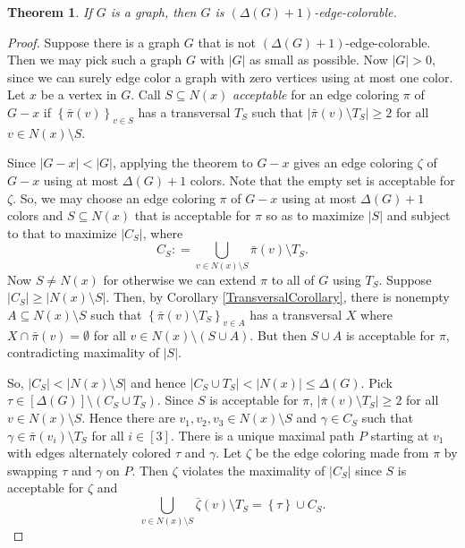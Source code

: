 \documentclass[openany]{tufte-book} %
\theoremstyle{plain}
\newtheorem{theorem}{Theorem}
\newcommand{\set}[1]{\left\{ #1 \right\}}
\newcommand{\card}[1]{\left|#1\right|}
\newcommand{\irange}[1]{\left[#1\right]}
\newcommand{\parens}[1]{\left( #1 \right)}
\newcommand{\DefinedAs}{\mathrel{\mathop:}=}
\begin{document}
\begin{theorem}
If $G$ is a graph, then $G$ is $\parens{\Delta(G) + 1}$-edge-colorable.
\end{theorem}
\begin{proof}
Suppose there is a graph $G$ that is not $(\Delta(G) + 1)$-edge-colorable.  Then we may pick such a graph $G$ with $\card{G}$ as small as possible.
Now $\card{G} > 0$, since we can surely edge color a graph with zero vertices using at most one color. Let $x$ be a vertex in $G$.   Call $S\subseteq N(x)$ \emph{acceptable} for 
an edge coloring $\pi$ of $G-x$ if $\set{\bar{\pi}(v)}_{v \in S}$ has a transversal $T_S$ such that $\card{\bar{\pi}(v) \setminus T_S} \ge 2$ for all $v \in N(x)\setminus S$.

Since $\card{G-x} < \card{G}$, applying the theorem to $G-x$ gives an edge coloring $\zeta$ of $G-x$ using at most $\Delta(G) + 1$ colors. 
Note that the empty set is acceptable for $\zeta$.  So, we may choose an edge coloring $\pi$ of $G-x$ using at most $\Delta(G) + 1$ colors and $S\subseteq N(x)$ 
that is acceptable for $\pi$ so as to maximize $\card{S}$ and subject to that to maximize $\card{C_S}$, where
\[C_S \DefinedAs \bigcup_{v \in N(x) \setminus S} \bar{\pi}(v) \setminus T_S.\]
Now $S \neq N(x)$ for otherwise we can extend $\pi$ to all of $G$ using $T_S$.  Suppose $\card{C_S}\ge \card{N(x) \setminus S}$.
Then, by Corollary \ref{TransversalCorollary}, there is nonempty $A \subseteq N(x) \setminus S$ such that $\set{\bar{\pi}(v)\setminus T_S}_{v \in A}$ has
a transversal $X$ where $X \cap \bar{\pi}(v) = \emptyset$ for all $v \in N(x) \setminus \parens{S \cup A}$.  But then $S\cup A$ is acceptable for $\pi$, contradicting
maximality of $\card{S}$.  

So, $\card{C_S}< \card{N(x) \setminus S}$ and hence $\card{C_S \cup T_S} < \card{N(x)} \le \Delta(G)$.  
Pick $\tau \in \irange{\Delta(G)} \setminus \parens{C_S \cup T_S}$.  Since $S$ is acceptable for $\pi$, $\card{\bar{\pi}(v) \setminus T_S} \ge 2$ for all $v \in N(x)\setminus S$.
Hence there are $v_1, v_2, v_3 \in N(x)\setminus S$ and $\gamma \in C_S$ such that $\gamma \in \bar{\pi}(v_i) \setminus T_S$ for all $i \in \irange{3}$.
There is a unique maximal path $P$ starting at $v_1$ with edges alternately colored $\tau$ and $\gamma$.  
Let $\zeta$ be the edge coloring made from $\pi$ by swapping $\tau$ and $\gamma$ on $P$.  Then $\zeta$ violates the maximality of $\card{C_S}$ since $S$ is acceptable for $\zeta$ and
\[\bigcup_{v \in N(x) \setminus S} \bar{\zeta}(v) \setminus T_S = \set{\tau} \cup C_S.\]

\end{proof}
\end{document}
